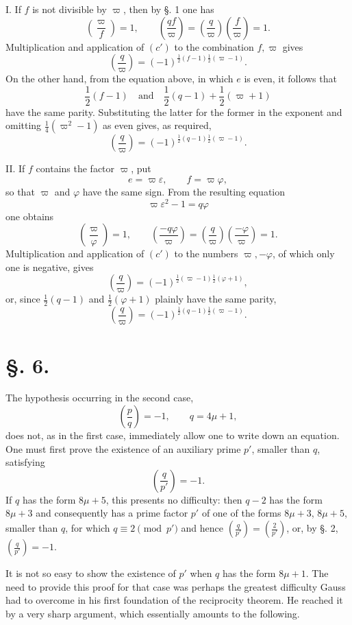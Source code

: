 \documentclass[11pt]{article}
\newcommand{\J}[2]{\left(\frac{#1}{#2}\right)}
\begin{document}
I. If $f$ is not divisible by $\varpi$, then by \S. 1 one has
\[
 \J{\varpi}{f}=1,
\qquad
 \J{qf}{\varpi}=\J{q}{\varpi}\J{f}{\varpi}=1.
\]
Multiplication and application of $(c')$ to the combination $f,\varpi$ gives
\[
 \J{q}{\varpi}=(-1)^{\frac12(f-1)\frac12(\varpi-1)}.
\]
On the other hand, from the equation above, in which $e$ is even, it follows that
\[
 \frac12(f-1)\quad\text{and}\quad \frac12(q-1)+\frac12(\varpi+1)
\]
have the same parity. Substituting the latter for the former in the exponent and omitting $\frac14(\varpi^2-1)$ as even gives, as required,
\[
 \J{q}{\varpi}=(-1)^{\frac12(q-1)\frac12(\varpi-1)}.
\]

II. If $f$ contains the factor $\varpi$, put
\[
 e=\varpi\varepsilon,
\qquad f=\varpi\varphi,
\]
so that $\varpi$ and $\varphi$ have the same sign. From the resulting equation
\[
 \varpi\varepsilon^2-1=q\varphi
\]
one obtains
\[
 \J{\varpi}{\varphi}=1,
\qquad
 \J{-q\varphi}{\varpi}=\J{q}{\varpi}\J{-\varphi}{\varpi}=1.
\]
Multiplication and application of $(c')$ to the numbers $\varpi,-\varphi$, of which only one is negative, gives
\[
 \J{q}{\varpi}=(-1)^{\frac12(\varpi-1)\frac12(\varphi+1)},
\]
or, since $\frac12(q-1)$ and $\frac12(\varphi+1)$ plainly have the same parity,
\[
 \J{q}{\varpi}=(-1)^{\frac12(q-1)\frac12(\varpi-1)}.
\]

\section*{\S. 6.}

The hypothesis occurring in the second case,
\[
 \J{p}{q}=-1,
\qquad q=4\mu+1,
\]
does not, as in the first case, immediately allow one to write down an equation. One must first prove the existence of an auxiliary prime $p'$, smaller than $q$, satisfying
\[
 \J{q}{p'}=-1.
\]
If $q$ has the form $8\mu+5$, this presents no difficulty: then $q-2$ has the form $8\mu+3$ and consequently has a prime factor $p'$ of one of the forms $8\mu+3$, $8\mu+5$, smaller than $q$, for which $q\equiv2\pmod {p'}$ and hence $\J{q}{p'}=\J{2}{p'}$, or, by \S. 2, $\J{q}{p'}=-1$.

It is not so easy to show the existence of $p'$ when $q$ has the form $8\mu+1$. The need to provide this proof for that case was perhaps the greatest difficulty Gauss had to overcome in his first foundation of the reciprocity theorem. He reached it by a very sharp argument, which essentially amounts to the following.
\end{document}
